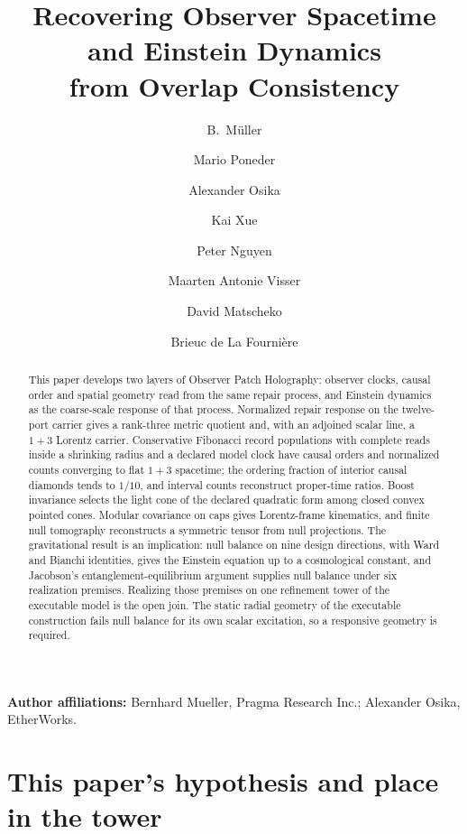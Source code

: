 \documentclass[11pt]{article}
\title{Recovering Observer Spacetime and Einstein Dynamics\\
from Overlap Consistency}
\author{B.\ M\"uller \and Mario Poneder \and Alexander Osika \and Kai Xue
\and Peter Nguyen \and Maarten Antonie Visser \and David Matscheko
\and Brieuc de La Fourni\`ere}
\date{\OPHPaperReleaseDate}
\begin{document}
\maketitle
\OPHPaperReleaseBanner

\begin{center}
\small\textbf{Author affiliations:} Bernhard Mueller, Pragma Research Inc.; Alexander Osika, EtherWorks.
\end{center}

\begin{abstract}
This paper develops two layers of Observer Patch Holography: observer
clocks, causal order and spatial geometry read from the same repair process,
and Einstein dynamics as the coarse-scale response of that process. Normalized
repair response on the twelve-port carrier gives a rank-three metric quotient
and, with an adjoined scalar line, a $1+3$ Lorentz carrier. Conservative
Fibonacci record populations with complete reads inside a shrinking radius and
a declared model clock have causal orders and normalized counts converging to
flat $1+3$ spacetime; the ordering fraction of interior causal diamonds tends to
$1/10$, and interval counts reconstruct proper-time ratios. Boost invariance
selects the light cone of the declared quadratic form among closed convex
pointed cones. Modular covariance on caps gives Lorentz-frame kinematics, and
finite null tomography reconstructs a symmetric tensor from null projections.
The gravitational result is an implication: null balance on nine design
directions, with Ward and Bianchi identities, gives the Einstein equation up to
a cosmological constant, and Jacobson's entanglement-equilibrium argument
supplies null balance under six realization premises. Realizing those premises
on one refinement tower of the executable model is the open join. The static
radial geometry of the executable construction fails null balance for its own
scalar excitation, so a responsive geometry is required.
\end{abstract}





\section*{This paper's hypothesis and place in the tower}
\end{document}
